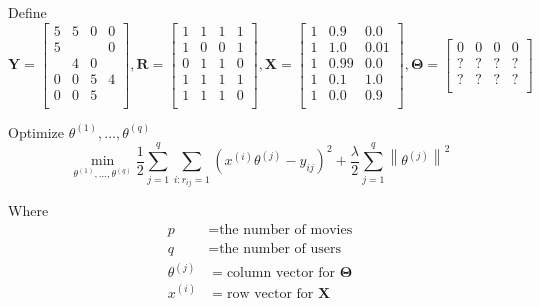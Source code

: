 Define
\begin{equation}
    \mathbf{Y} = \left[\begin{array}{cccc} 5 & 5 & 0 & 0 \\ 5 &   &   & 0 \\   & 4 & 0 &   \\ 0 & 0 & 5 & 4 \\ 0 & 0 & 5 &   \\ \end{array}\right], 
    \mathbf{R} = \left[\begin{array}{cccc} 1 & 1 & 1 & 1 \\ 1 & 0 & 0 & 1 \\ 0 & 1 & 1 & 0 \\ 1 & 1 & 1 & 1 \\ 1 & 1 & 1 & 0 \\ \end{array}\right], 
    \mathbf{X} = \left[\begin{array}{ccc} 1 & 0.9 & 0.0 \\ 1 & 1.0 & 0.01 \\ 1 & 0.99 & 0.0 \\ 1 & 0.1 & 1.0 \\ 1 & 0.0 & 0.9 \\ \end{array}\right],
    \mathbf{\Theta} = \left[\begin{array}{cccc} 0 & 0 & 0 & 0 \\ ? & ? & ? & ? \\ ? & ? & ? & ? \\ \end{array}\right]
\end{equation}


Optimize $\theta^{(1)}, \dots, \theta^{(q)}$
\begin{equation}
    \min_{\theta^{(1)}, \dots, \theta^{(q)}} \frac{1}{2}\sum_{j=1}^{q}\sum_{i:r_{ij}=1}\left(x^{(i)}\theta^{(j)} - y_{ij}\right)^2 + \frac{\lambda}{2}\sum_{j=1}^{q} \left\|\theta^{(j)}\right\|^2
\end{equation}


Where
\begin{equation}
    \begin{array}{ll}
        p            &= \text{the number of movies}\\
        q            &= \text{the number of users} \\
        \theta^{(j)} &= \text{column vector for $\mathbf{\Theta}$}\\
        x^{(i)}      &= \text{row vector for $\mathbf{X}$}\\
    \end{array}
\end{equation}


